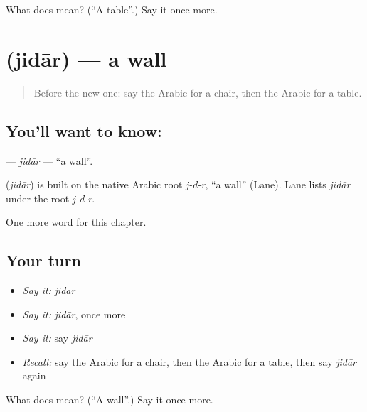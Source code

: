\begin{tcolorbox}[breakable,colback=teal!4,colframe=teal!35!black,title={Before you move on}]
What does  mean? (\textquotedblleft{}A table\textquotedblright{}.) Say it once more.
\end{tcolorbox}
\section[\texorpdfstring{\ar{جدار} (jidār)}{جدار (jidār)}]{ (jidār) — a wall}

\label{lesson:AR-C70-jidar}



\begin{quote}
Before the new one: say the Arabic for a chair, then the Arabic for a table.
\end{quote}

\subsection*{You'll want to know: }
\textbf{} — \emph{jidār} — \textquotedblleft{}a wall\textquotedblright{}.

\begin{cousinweb}
\textbf{} (\emph{jidār}) is built on the native Arabic root \emph{j-d-r}, \textquotedblleft{}a wall\textquotedblright{} (Lane). Lane lists \emph{jidār} under the root \emph{j-d-r}.
\end{cousinweb}

\begin{grammarlens}[title={What you've built}]
One more word for this chapter.
\end{grammarlens}

\subsection*{Your turn}
\begin{itemize}
\raggedright
  \item \emph{Say it:} \emph{jidār}
  \item \emph{Say it:} \emph{jidār}, once more
  \item \emph{Say it:} say \emph{jidār}
  \item \emph{Recall:} say the Arabic for a chair, then the Arabic for a table, then say \emph{jidār} again
\end{itemize}

\begin{tcolorbox}[breakable,colback=teal!4,colframe=teal!35!black,title={Before you move on}]
What does  mean? (\textquotedblleft{}A wall\textquotedblright{}.) Say it once more.
\end{tcolorbox}
